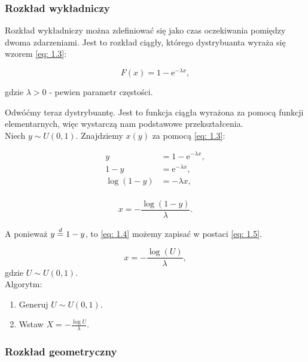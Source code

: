 \documentclass{article}
\theoremstyle{break}
\newcommand*{\e}{\mathrm{e}}
\numberwithin{equation}{subsection}
\numberwithin{figure}{section}
\begin{document}
\newpage

\subsubsection{Rozkład wykładniczy}

Rozkład wykładniczy można zdefiniować się jako czas oczekiwania pomiędzy dwoma zdarzeniami. Jest to rozkład ciągły, którego dystrybuanta wyraża się wzorem \eqref{eq: 1.3}:

\begin{equation}
F(x) = 1 - \e^{-\lambda x}, \label{eq: 1.3}
\end{equation}

gdzie $\lambda > 0$ - pewien parametr częstości.

Odwóćmy teraz dystrybuantę. Jest to funkcja ciągła wyrażona za pomocą funkcji elementarnych, więc wystarczą nam podstawowe przekształcenia.\\
Niech $y \sim U(0, 1)$. Znajdziemy $x(y)$ za pomocą \eqref{eq: 1.3}:

\begin{equation}
\begin{aligned}
	y &= 1 - \e^{-\lambda x},\\
	1-y &= \e^{-\lambda x},\\
	\log(1-y) &= -\lambda x,\\
\end{aligned}
\end{equation}

\begin{equation}
x = -\frac{\log(1-y)}{\lambda}. \label{eq: 1.4}
\end{equation}

A ponieważ $y \buildrel d \over = 1-y$, to \eqref{eq: 1.4} możemy zapisać w postaci \eqref{eq: 1.5}.

\begin{equation}
x = -\frac{\log(U)}{\lambda} \label{eq: 1.5},
\end{equation}
gdzie $U \sim U(0, 1)$.\\

Algorytm:
\begin{enumerate}
\item Generuj $U \sim U(0, 1)$.
\item Wstaw $ X = -\frac{\log{U}}{\lambda}$.
\end{enumerate}

\newpage

\subsubsection{Rozkład geometryczny}
\end{document}
